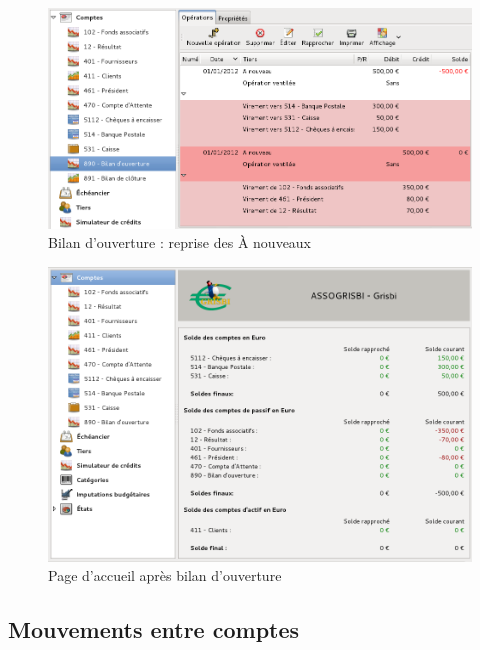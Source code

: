 \ifIllustration
\begin{figure}[ht]
\begin{center}
\includegraphics[scale=0.5]{image/screenshot/asso_renew}
\end{center}
\caption{Bilan d’ouverture : reprise des \og À nouveaux \fg{}}
\label{asso-renew-img}
\end{figure}
\fi

\ifIllustration
\begin{figure}[ht]
\begin{center}
\includegraphics[scale=0.5]{image/screenshot/asso_afterOpening}
\end{center}
\caption{Page d'accueil après bilan d'ouverture}
\label{asso-afterOpening-img}
\end{figure}
\fi


\subsection{Mouvements entre comptes\label{association-plan-activity}}

